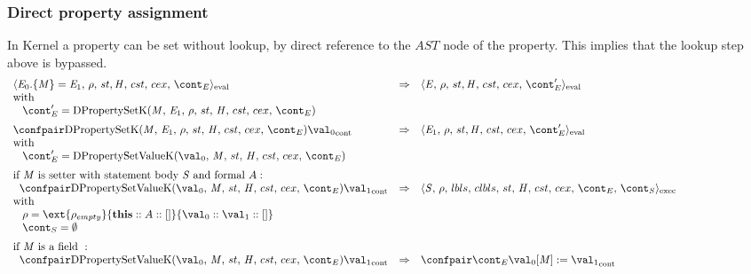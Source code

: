 \documentclass{article}
\begin{document}
\subsubsection{Direct property assignment}
\label{subsubsec:direct-property-assignment}
In Kernel a property can be set without lookup, by direct reference to the $AST$ node of the property. This implies that the lookup step above is bypassed.
\newcommand{\DirectPropertySetK}{\mathrm{DPropertySetK}(\membermeta,\,\expressionmeta_1,\,\env,\,\strace,\,\handler,\,\cstrace,\,\cex,\,\econt)}
\newcommand{\DPropertysetVK}{\mathrm{DPropertySetValueK}(\val_0,\,\membermeta,\,\strace,\,\handler,\,\cstrace,\,\cex,\,\econt)}
\[
  \begin{array}{lcl@{\hspace{30mm}}}
	\cesktrans{
		\evalconf{\DirectPropertySet{\expressionmeta_0}{\membermeta}{\expressionmeta_1}}{\env}{\strace}{\cstrace}{\cex}{\econt}}{
		\evalconf{\expressionmeta}{\env}{\strace}{\cstrace}{\cex}{\econt'}}\\
	\textrm{with}\\
	\hspace{3mm}
	\econt' = \DirectPropertySetK\\[2mm]

	\cesktrans{
		\contconf{\DirectPropertySetK}{\val_0}}{
		\evalconf{\expressionmeta_1}{\env}{\strace}{\cstrace}{\cex}{\econt'}}\\
	\textrm{with}\\
	\hspace{3mm}
	\econt' = \DPropertysetVK\\[2mm]

	\textrm{if }\membermeta \textrm{ is setter with statement body }\stmt \textrm{ and formal }\formal :\\
	\hspace{2mm}
	\cesktrans{
		\contconf{\DPropertysetVK}{\val_1}}{
		\execconf{\stmt}{\env}{\lbls}{\clbls}{\handler}{\cstrace}{\cex}{\econt}{\scont}}\\
	\textrm{with}\\
	\hspace{3mm}
	\env = \ext{\env_{empty}}{\mathbf{this} :: \formal :: []}{\val_0 :: \val_1 :: []}\\
	\hspace{3mm}
	\scont = \emptyset\\[2mm]

	\textrm{if }\membermeta \textrm{ is a field } :\\
	\hspace{2mm}
	\cesktrans{
		\contconf{\DPropertysetVK}{\val_1}}{
		\contconf{\econt}{\update{\val_0[\membermeta]}{\val_1}}}
  \end{array}
\]
\end{document}
